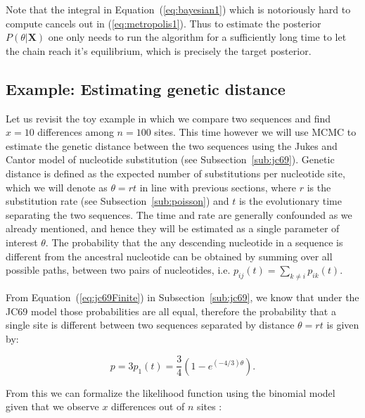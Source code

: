 Note that the integral in Equation~(\ref{eq:bayesian1}) which is notoriously hard to compute cancels out in (\ref{eq:metropolis1}).
Thus to estimate the posterior $P\left(\theta|\mathbf{X}\right)$ one only needs to run the algorithm for a sufficiently long time to let the chain reach it's equilibrium, which is precisely the target posterior.

\subsection{Example: Estimating genetic distance}

Let us revisit the toy example in which we compare two sequences and find $x=10$ differences among $n=100$ sites.
This time however we will use MCMC to estimate the genetic distance between the two sequences using the Jukes and Cantor model of nucleotide substitution (see Subsection~\ref{sub:jc69}).
Genetic distance is defined as the expected number of substitutions per nucleotide site, which we will denote as $\theta=rt$ in line with previous sections, where $r$ is the substitution rate (see Subsection~\ref{sub:poisson}) and $t$ is the evolutionary time separating the two sequences.
The time and rate are generally confounded as we already mentioned, and hence they will be estimated as a single parameter of interest $\theta$.
The probability that the any descending nucleotide in a sequence is different from the ancestral nucleotide can be obtained by summing over all possible paths, between two pairs of nucleotides, i.e. $p_{ij}(t)=\underset{k\neq i}{\sum}p_{ik}(t)$.

From Equation~(\ref{eq:jc69Finite}) in Subsection~\ref{sub:jc69}, we know that under the JC69 model those probabilities are all equal, therefore the probability that a single site is different between two sequences separated by distance $\theta=rt$ is given by:

\begin{equation}
p=3p_{1}\left(t\right)=\frac{3}{4}\left(1-e^{\left(-4/3\right)\theta}\right).
\label{eq:distance1}
\end{equation}

\noindent
From this we can formalize the likelihood function using the binomial model given that we observe $x$ differences out of $n$ sites :

